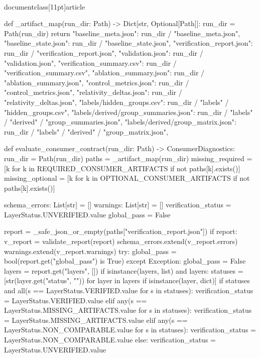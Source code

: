 \\documentclass[11pt]{article}
\begin{document}
\begin{CodeBlock}
def _artifact_map(run_dir: Path) -> Dict[str, Optional[Path]]:
    run_dir = Path(run_dir)
    return {
        "baseline_meta.json": run_dir / "baseline_meta.json",
        "baseline_state.json": run_dir / "baseline_state.json",
        "verification_report.json": run_dir / "verification_report.json",
        "validation.json": run_dir / "validation.json",
        "verification_summary.csv": run_dir / "verification_summary.csv",
        "ablation_summary.json": run_dir / "ablation_summary.json",
        "control_metrics.json": run_dir / "control_metrics.json",
        "relativity_deltas.json": run_dir / "relativity_deltas.json",
        "labels/hidden_groups.csv": run_dir / "labels" / "hidden_groups.csv",
        "labels/derived/group_summaries.json": run_dir / "labels" / "derived" / "group_summaries.json",
        "labels/derived/group_matrix.json": run_dir / "labels" / "derived" / "group_matrix.json",
    }


def evaluate_consumer_contract(run_dir: Path) -> ConsumerDiagnostics:
    run_dir = Path(run_dir)
    paths = _artifact_map(run_dir)
    missing_required = [k for k in REQUIRED_CONSUMER_ARTIFACTS if not paths[k].exists()]
    missing_optional = [k for k in OPTIONAL_CONSUMER_ARTIFACTS if not paths[k].exists()]

    schema_errors: List[str] = []
    warnings: List[str] = []
    verification_status = LayerStatus.UNVERIFIED.value
    global_pass = False

    report = _safe_json_or_empty(paths["verification_report.json"])
    if report:
        v_report = validate_report(report)
        schema_errors.extend(v_report.errors)
        warnings.extend(v_report.warnings)
        try:
            global_pass = bool(report.get("global_pass") is True)
        except Exception:
            global_pass = False
        layers = report.get("layers", [])
        if isinstance(layers, list) and layers:
            statuses = [str(layer.get("status", "")) for layer in layers if isinstance(layer, dict)]
            if statuses and all(s == LayerStatus.VERIFIED.value for s in statuses):
                verification_status = LayerStatus.VERIFIED.value
            elif any(s == LayerStatus.MISSING_ARTIFACTS.value for s in statuses):
                verification_status = LayerStatus.MISSING_ARTIFACTS.value
            elif any(s == LayerStatus.NON_COMPARABLE.value for s in statuses):
                verification_status = LayerStatus.NON_COMPARABLE.value
            else:
                verification_status = LayerStatus.UNVERIFIED.value


\end{CodeBlock}
\end{document}
